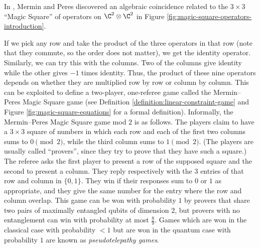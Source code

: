 In \cite{peres1990incompatible,mermin1990simple}, Mermin and Peres discovered an algebraic coincidence related to the $3\times3$ ``Magic Square'' of operators on $\C^2\otimes \C^2$ in Figure \ref{fig:magic-square-operators-introduction}.

If we pick any row and take the product of the three operators in that row (note that they commute, so the order does not matter), we get the identity operator. Similarly, we can try this with the columns. Two of the columns give identity while the other  gives $-1$ times identity. Thus, the product of these nine operators depends on whether they are multiplied row by row or column by column. This can be exploited to define a two-player, one-referee game called the Mermin--Peres Magic Square game \cite{aravind2004quantum} (see Definition \ref{definition:linear-constraint-game} and Figure \ref{fig:magic-square-equations} for a formal definition). Informally, the Mermin--Peres Magic Square game mod $2$ is as follows. The players claim to have a $3\times 3$ square of numbers in which each row and each of the first two columns sums to $0\pmod 2$, while the third column sums to $1\pmod 2$. (The players are usually called ``provers'', since they try to prove that they have such a square.) The referee asks the first player to present a row of the supposed square and the second to present a column. They reply respectively with the $3$ entries of that row and column in $\{0,1\}$. They win if their responses sum to $0$ or $1$ as appropriate, and they give the same number for the entry where the row and column overlap. This game can be won with probability $1$ by provers that share two pairs of maximally entangled qubits of dimension $2$, but provers with no entanglement can win with probability at most $\frac89$. Games which are won in the classical case with probability $< 1$ but are won in the quantum case with probability $1$ are known as \emph{pseudotelepathy games}.


